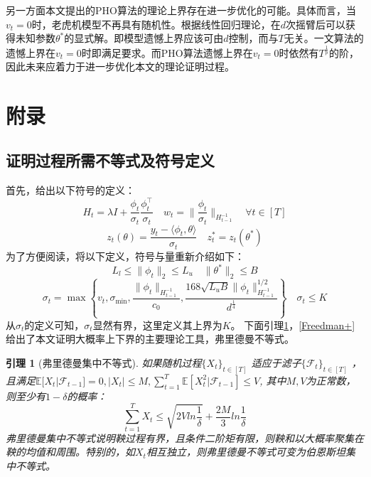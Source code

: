 \documentclass[UTF8,a4paper,10.5pt]{ctexart}
\newcommand{\Fcal}{\mathcal F}
\newcommand{\E}{\mathbb{E}}
\newtheorem{lemma}[theorem]{引理}
\begin{document}
另一方面本文提出的PHO算法的理论上界存在进一步优化的可能。具体而言，当$v_t=0$时，老虎机模型不再具有随机性。根据线性回归理论，在$d$次摇臂后可以获得未知参数$\theta^*$的显式解。即模型遗憾上界应该可由$d$控制，而与$T$无关。\cite{Xiang23}一文算法的遗憾上界在$v_t=0$时即满足要求。而PHO算法遗憾上界在$v_t=0$时依然有$T^{\frac{1}{p}}$的阶，因此未来应着力于进一步优化本文的理论证明过程。
\newpage
\clearpage
\appendix

\section{附录}
\label{appendix}
\subsection{证明过程所需不等式及符号定义}
首先，给出以下符号的定义：
\begin{equation}
	H_t = \lambda I + \frac{\phi_t}{\sigma_t}\frac{\phi_t^\top}{\sigma_t} \quad w_t = \|\frac{\phi_t}{\sigma_t}\|_{H_{t-1}^{-1}} \quad \forall t\in [T]
	\label{Hw_def}
\end{equation}
\begin{equation}
	z_t(\theta) = \frac{y_t-\langle \phi_t, \theta\rangle}{\sigma_t} \quad z^*_t = z_t(\theta^*)
	\label{z_def}
\end{equation}
为了方便阅读，将以下定义，符号与量重新介绍如下：
\begin{equation}
	L_l\leq \|\phi_t\|_2\leq L_u\quad \|\theta^*\|_2\leq B
\end{equation}
\begin{equation}
	\sigma_t = \max\left\{v_t, \sigma_{\min}, \frac{\|\phi_t\|_{H_{t-1}^{-1}}}{c_0}, \frac{168\sqrt{L_uB}\|\phi_t\|^{1/2}_{H_{t-1}^{-1}}}{d^{\frac{1}{4}}}\right\} \quad \sigma_t \leq K
\end{equation}
从$\sigma_t$的定义可知，$\sigma_t$显然有界，这里定义其上界为$K$。
下面引理\ref{Freedman}，\ref{Freedman+}给出了本文证明大概率上下界的主要理论工具，弗里德曼不等式。
\begin{lemma}[弗里德曼集中不等式]\cite{Freedman1975}
	如果随机过程$\{X_t\}_{t\in [T]}$ 适应于滤子$\{\Fcal_t\}_{t\in [T]}$ ，且满足$\E[X_t|\Fcal_{t-1}] = 0, |X_t|\leq M, \sum_{t=1}^T\E[X_t^2|\Fcal_{t-1}]\leq V$, 其中$M, V$为正常数，则至少有$1-\delta$的概率：
	\begin{equation*}
		\sum_{t=1}^T X_t\leq \sqrt{2Vln\frac{1}{\delta}} + \frac{2M}{3}ln\frac{1}{\delta}
	\end{equation*}
	弗里德曼集中不等式说明鞅过程有界，且条件二阶矩有限，则鞅和以大概率聚集在鞅的均值和周围。特别的，如$X_t$相互独立，则弗里德曼不等式可变为伯恩斯坦集中不等式\cite{Freedman+}。
	\label{Freedman}
\end{lemma}
\end{document}
